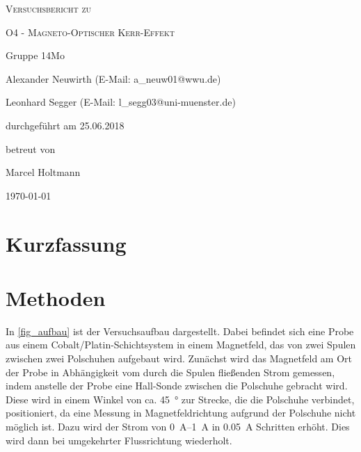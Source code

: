 \documentclass[
	a4paper,
	12pt,
	pagesize,
	ngerman
]{scrartcl}
\begin{document}
	
	\begin{titlepage}
		\centering
		{\scshape\LARGE Versuchsbericht zu \par}
		\vspace{1cm}
		{\scshape\huge O4 - Magneto-Optischer Kerr-Effekt \par}
		\vspace{2.5cm}
		{\LARGE Gruppe 14Mo \par}
		\vspace{0.5cm}
		
		{\large Alexander Neuwirth (E-Mail: a\_neuw01@wwu.de) \par}
		{\large Leonhard Segger (E-Mail: l\_segg03@uni-muenster.de) \par}
		\vfill
		
		durchgeführt am 25.06.2018\par
		betreut von\par
		{\large Marcel Holtmann} %
		
		\vfill
		
		{\large \today\par}
	\end{titlepage}
	\tableofcontents
	\newpage


	\section{Kurzfassung}
	
	\section{Methoden}
	In \cref{fig_aufbau} ist der Versuchsaufbau dargestellt.
	Dabei befindet sich eine Probe aus einem Cobalt/Platin-Schichtsystem in einem Magnetfeld, das von zwei Spulen zwischen zwei Polschuhen aufgebaut wird.
	Zunächst wird das Magnetfeld am Ort der Probe in Abhängigkeit vom durch die Spulen fließenden Strom gemessen, indem anstelle der Probe eine Hall-Sonde zwischen die Polschuhe gebracht wird.
	Diese wird in einem Winkel von ca. \SI{45}{\degree} zur Strecke, die die Polschuhe verbindet, positioniert, da eine Messung in Magnetfeldrichtung aufgrund der Polschuhe nicht möglich ist.
	Dazu wird der Strom von \SIrange{0}{1}{\ampere} in \SI{0,05}{\ampere} Schritten erhöht.
	Dies wird dann bei umgekehrter Flussrichtung wiederholt.
\end{document}
